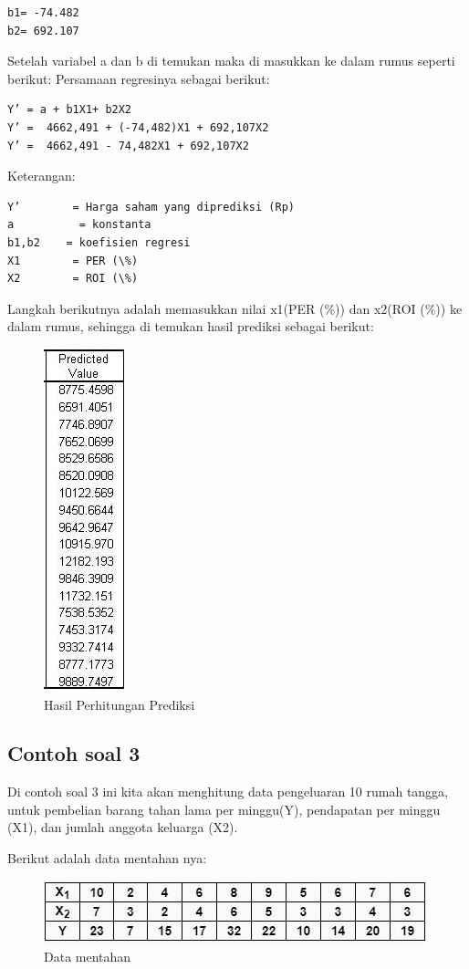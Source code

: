 \begin{lstlisting}
b1= -74.482
b2= 692.107
\end{lstlisting}
Setelah variabel a dan b di temukan maka di masukkan ke dalam rumus seperti berikut: 
Persamaan regresinya sebagai berikut:
\begin{lstlisting}
Y’ = a + b1X1+ b2X2
Y’ =  4662,491 + (-74,482)X1 + 692,107X2
Y’ =  4662,491 - 74,482X1 + 692,107X2
\end{lstlisting}
Keterangan:
\begin{lstlisting}
Y’        = Harga saham yang diprediksi (Rp)
a          = konstanta
b1,b2    = koefisien regresi
X1        = PER (\%)
X2        = ROI (\%)
\end{lstlisting}
\par Langkah berikutnya adalah memasukkan nilai x1(PER (\%)) dan x2(ROI (\%)) ke dalam rumus, sehingga di temukan hasil prediksi sebagai berikut:
\begin{figure}[!htbp]
    \centering
    \includegraphics[scale=0.6]{figures/cs3.JPG}
    \caption{Hasil Perhitungan Prediksi}
\end{figure}
\subsection{Contoh soal 3}
\par Di contoh soal 3 ini kita akan menghitung data pengeluaran 10 rumah tangga, untuk pembelian barang tahan lama per minggu(Y), pendapatan per minggu (X1), dan jumlah anggota keluarga (X2).
\par Berikut adalah data mentahan nya:
\begin{figure}[!htbp]
    \centering
    \includegraphics[scale=0.7]{figures/css.JPG}
    \caption{Data mentahan}
\end{figure}
